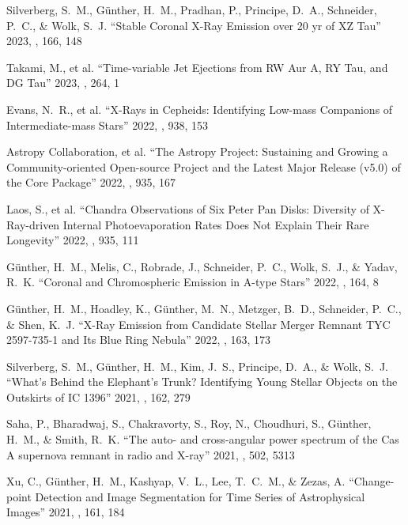 
 Silverberg, S.~M., G{\"u}nther, H.~M., Pradhan, P., Principe, D.~A., Schneider, P.~C., \& Wolk, S.~J. ``Stable Coronal X-Ray Emission over 20 yr of XZ Tau'' 2023, \aj, 166, 148

 Takami, M., et al. ``Time-variable Jet Ejections from RW Aur A, RY Tau, and DG Tau'' 2023, \apjs, 264, 1

 Evans, N.~R., et al. ``X-Rays in Cepheids: Identifying Low-mass Companions of Intermediate-mass Stars'' 2022, \apj, 938, 153

 Astropy Collaboration, et al. ``The Astropy Project: Sustaining and Growing a Community-oriented Open-source Project and the Latest Major Release (v5.0) of the Core Package'' 2022, \apj, 935, 167

 Laos, S., et al. ``Chandra Observations of Six Peter Pan Disks: Diversity of X-Ray-driven Internal Photoevaporation Rates Does Not Explain Their Rare Longevity'' 2022, \apj, 935, 111

 G{\"u}nther, H.~M., Melis, C., Robrade, J., Schneider, P.~C., Wolk, S.~J., \& Yadav, R.~K. ``Coronal and Chromospheric Emission in A-type Stars'' 2022, \aj, 164, 8

 G{\"u}nther, H.~M., Hoadley, K., G{\"u}nther, M.~N., Metzger, B.~D., Schneider, P.~C., \& Shen, K.~J. ``X-Ray Emission from Candidate Stellar Merger Remnant TYC 2597-735-1 and Its Blue Ring Nebula'' 2022, \aj, 163, 173

 Silverberg, S.~M., G{\"u}nther, H.~M., Kim, J.~S., Principe, D.~A., \& Wolk, S.~J. ``What's Behind the Elephant's Trunk? Identifying Young Stellar Objects on the Outskirts of IC 1396'' 2021, \aj, 162, 279

 Saha, P., Bharadwaj, S., Chakravorty, S., Roy, N., Choudhuri, S., G{\"u}nther, H.~M., \& Smith, R.~K. ``The auto- and cross-angular power spectrum of the Cas A supernova remnant in radio and X-ray'' 2021, \mnras, 502, 5313

 Xu, C., G{\"u}nther, H.~M., Kashyap, V.~L., Lee, T.~C.~M., \& Zezas, A. ``Change-point Detection and Image Segmentation for Time Series of Astrophysical Images'' 2021, \aj, 161, 184

